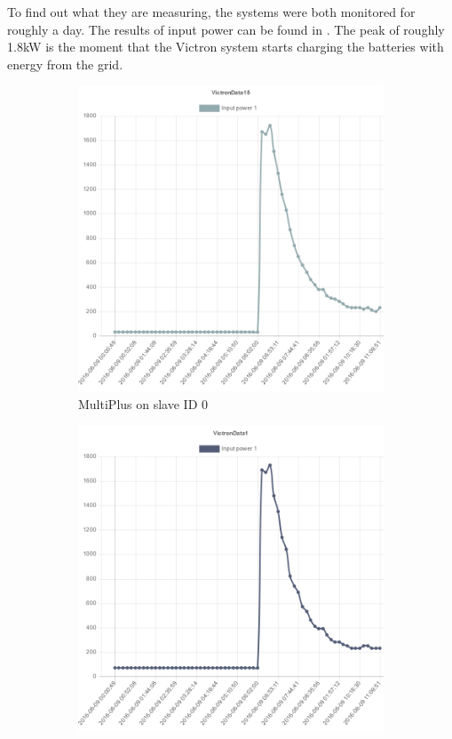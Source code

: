 To find out what they are measuring, the systems were both monitored for roughly a day. The results of input power can be found in . The peak of roughly 1.8kW is the moment that the Victron system starts charging the batteries with energy from the grid.\\

\begin{figure}
\centering
\begin{subfigure}{.5\textwidth}
  \centering
  \includegraphics[width=.95\linewidth]{images/Input_power_30W.png}
  \caption{MultiPlus on slave ID 0}
  \label{fig:MultiPlus_input_30W}
\end{subfigure}%
\begin{subfigure}{.5\textwidth}
  \centering
  \includegraphics[width=.95\linewidth]{images/Input_power_70W.png}

\end{subfigure}
\end{figure}
